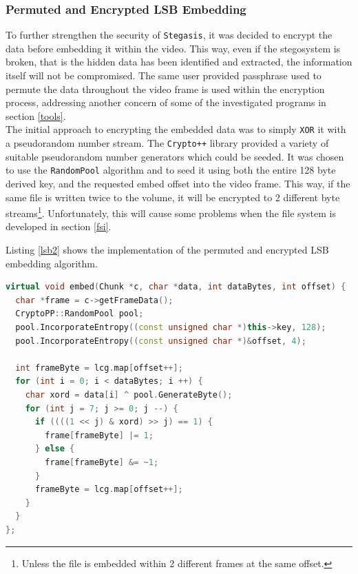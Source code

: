 \documentclass[paper=a4, fontsize=11pt,twoside]{scrartcl}
\numberwithin{table}{section}
\numberwithin{figure}{section}
\numberwithin{algorithm}{section}
\begin{document}
\subsubsection{Permuted and Encrypted LSB Embedding}

To further strengthen the security of \texttt{Stegasis}, it was decided to encrypt the data before embedding it within the video. This way, even if the stegosystem is broken, that is the hidden data has been identified and extracted, the information itself will not be compromised. The same user provided passphrase used to permute the data throughout the video frame is used within the encryption process, addressing another concern of some of the investigated programs in section \ref{tools}.\\

\noindent
The initial approach to encrypting the embedded data was to simply \texttt{XOR} it with a pseudorandom number stream. The \texttt{Crypto++} library provided a variety of suitable pseudorandom number generators which could be seeded. It was chosen to use the \texttt{RandomPool} algorithm and to seed it using both the entire 128 byte derived key, and the requested embed offset into the video frame. This way, if the same file is written twice to the volume, it will be encrypted to 2 different byte streams\footnote{Unless the file is embedded within 2 different frames at the same offset.}. Unfortunately, this will cause some problems when the file system is developed in section \ref{fsi}.

Listing \ref{lsb2} shows the implementation of the permuted and encrypted LSB embedding algorithm.

\begin{lstlisting}[language=C++, caption={Encrypted and permuted embedding (\texttt{steg/lsb2\_algorithm.cc:41})}, frame=single, label=lsb2]
virtual void embed(Chunk *c, char *data, int dataBytes, int offset) {
  char *frame = c->getFrameData();
  CryptoPP::RandomPool pool;
  pool.IncorporateEntropy((const unsigned char *)this->key, 128);
  pool.IncorporateEntropy((const unsigned char *)&offset, 4);
  
  int frameByte = lcg.map[offset++];
  for (int i = 0; i < dataBytes; i ++) {
    char xord = data[i] ^ pool.GenerateByte();
    for (int j = 7; j >= 0; j --) {
      if ((((1 << j) & xord) >> j) == 1) {
        frame[frameByte] |= 1;
      } else {
        frame[frameByte] &= ~1;
      }
      frameByte = lcg.map[offset++];
    }
  }
};
\end{lstlisting}
\end{document}
